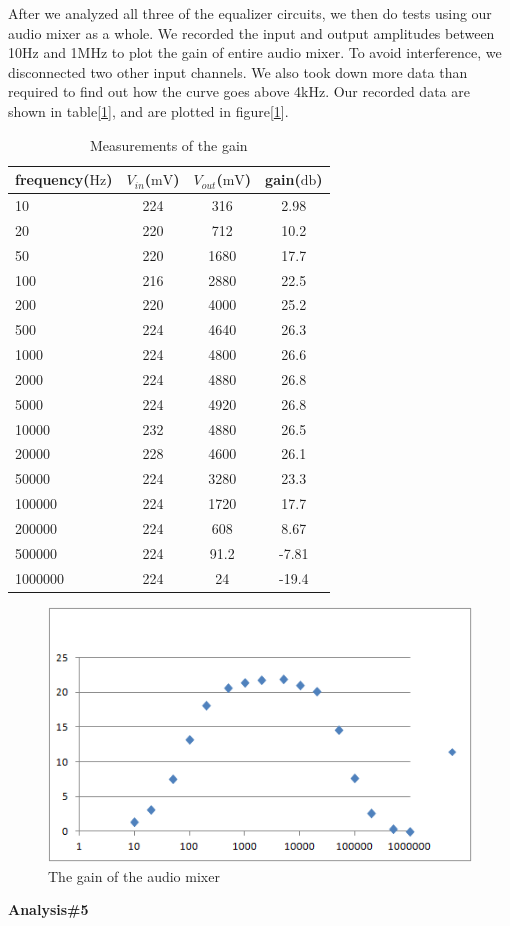 \phantom{ } After we analyzed all three of the equalizer circuits, we then do tests using our audio mixer as a whole. We recorded the input and output amplitudes between 10Hz and 1MHz to plot the gain of entire audio mixer. To avoid interference, we disconnected two other input channels. We also took down more data than required to find out how the curve goes above 4kHz. Our recorded data are shown in table[\ref{tab:datagain}], and are plotted in figure[\ref{fig:mixerg}].\\

\begin{table}[!htbp]
	\centering
	\caption{Measurements of the gain}
	\label{tab:datagain}
	\begin{tabular}{lccc}
		\toprule
		frequency($\si{\hertz}$) & $V_{in}$($\si{\milli\volt}$) & $V_{out}$($\si{\milli\volt}$) & gain($\si{\decibel}$) \\
		\midrule
		10	&224&	316&	2.98\\
		20	&220&	712&	10.2\\
		50	&220&	1680&	17.7\\
		100	&216&	2880&	22.5\\
		200	&220&	4000&	25.2\\
		500	&224&	4640&	26.3\\
		1000&	224&	4800&	26.6\\
		2000&	224&	4880&	26.8\\
		5000&	224&	4920&	26.8\\
		10000&	232&	4880&	26.5\\
		20000&	228&	4600&	26.1\\
		50000&	224&	3280&	23.3\\
		100000&	224&	1720&	17.7\\
		200000&	224&	608&	8.67\\
		500000&	224&	91.2&	-7.81\\
		1000000&	224&	24&	-19.4\\
		\bottomrule
	\end{tabular}
\end{table}

\begin{figure}[!htbp]
	\centering
	\begin{framed}
		\includegraphics[width=\linewidth]{images/mixerg.png}
		\caption{The gain of the audio mixer}
		\label{fig:mixerg}
	\end{framed}
\end{figure}


\textbf{Analysis\#5} \newline